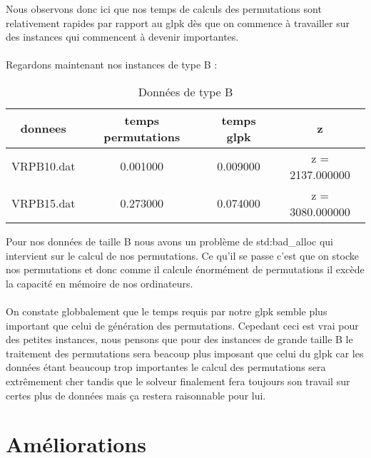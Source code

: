 \documentclass[a4paper,sffamily,12pt]{article}
\begin{document}
		\vspace{0.5cm}		
		
		Nous observons donc ici que nos temps de calculs des permutations sont relativement rapides par rapport au glpk dès que on commence à travailler sur des instances qui commencent à devenir importantes. \\
		\\
	Regardons maintenant nos instances de type B : \\

		\begin{table}[!h]
				
			\centering
				
			\begin{tabular}{| c | c | c | c |}
			    	
			    	\hline
			  	 donnees  & temps permutations & temps glpk  &  z   \\
				\hline
				VRPB10.dat	&	0.001000		&	0.009000	&		z = 2137.000000\\
				\hline
				VRPB15.dat	&	0.273000		&	0.074000	&		z = 3080.000000\\
				\hline
				
			\end{tabular}
			
			\caption{Données de type B}	
			
		\end{table}

		\vspace{0.5cm}		
		
		Pour nos données de taille B nous avons un problème de std:bad\_alloc qui intervient sur le calcul de nos permutations. Ce qu'il se passe c'est que on stocke nos permutations et donc comme il calcule énormément de permutations il excède la capacité en mémoire de nos ordinateurs. \\
		\\
		\indent On constate globbalement que le temps requis par notre glpk semble plus important que celui de génération des permutations. Cepedant ceci est vrai pour des petites instances, nous pensons que pour des instances de grande taille B le traitement des permutations sera beacoup plus imposant que celui du glpk car les données étant beaucoup trop importantes le calcul des permutations sera extrêmement cher tandis que le solveur finalement fera toujours son travail sur certes plus de données mais ça restera raisonnable pour lui. \\

						
	\section{Améliorations}
	
\end{document}
